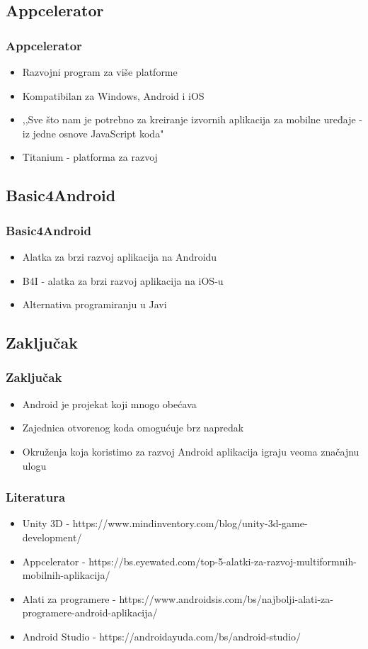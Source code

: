 \documentclass{beamer}
\begin{document}
\begin{frame}
    \section{Appcelerator}
    \frametitle{Appcelerator} 
    \begin{itemize}
    	\item Razvojni program za više platforme
	\item Kompatibilan za Windows, Android i iOS
	\item ,,Sve što nam je potrebno za kreiranje izvornih aplikacija za mobilne uređaje - iz jedne osnove JavaScript koda"
	\item  Titanium - platforma za razvoj
   \end{itemize}
\end{frame}

\begin{frame}
    \section{Basic4Android}
    \frametitle{Basic4Android} 
    \begin{itemize}
	\item Alatka za brzi razvoj aplikacija na Androidu
	\item B4I - alatka za brzi razvoj aplikacija na iOS-u
	\item Alternativa programiranju u Javi
   \end{itemize}
\end{frame}

\begin{frame}
    \section{Zaključak}
    \frametitle{Zaključak} 
    \begin{itemize}
	\item Android je projekat koji mnogo obećava
	\item Zajednica otvorenog koda omogućuje brz napredak
	\item Okruženja koja koristimo za razvoj Android aplikacija igraju veoma značajnu ulogu
	
   \end{itemize}
\end{frame}

\begin{frame}
    \frametitle{Literatura}
    \begin{itemize}
    	\item Unity 3D - https://www.mindinventory.com/blog/unity-3d-game-development/
	\item Appcelerator - https://bs.eyewated.com/top-5-alatki-za-razvoj-multiformnih-mobilnih-aplikacija/
	\item Alati za programere - https://www.androidsis.com/bs/najbolji-alati-za-programere-android-aplikacija/
	\item Android Studio - https://androidayuda.com/bs/android-studio/
   \end{itemize}
\end{frame}
\end{document}
